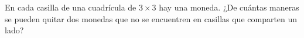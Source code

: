 En cada casilla de una cuadrícula de $3 \times 3$ hay una moneda. ¿De cuántas maneras se pueden quitar dos monedas que no se encuentren en casillas que comparten un lado?